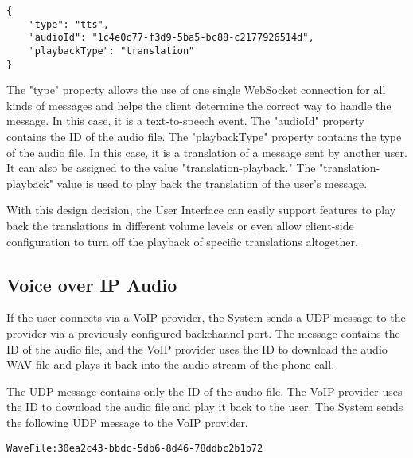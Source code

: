\begin{verbatim}
{
    "type": "tts",
    "audioId": "1c4e0c77-f3d9-5ba5-bc88-c2177926514d",
    "playbackType": "translation"
}
\end{verbatim}

The "type" property allows the use of one single WebSocket connection for all kinds of messages and helps the client 
determine the correct way to handle the message. In this case, it is a text-to-speech event. The "audioId" property 
contains the ID of the audio file. The "playbackType" property contains the type of the audio file. In this case, it is 
a translation of a message sent by another user. It can also be assigned to the value "translation-playback." The 
"translation-playback" value is used to play back the translation of the user's message.

With this design decision, the User Interface can easily support features to play back the translations in different 
volume levels or even allow client-side configuration to turn off the playback of specific translations altogether.

\subsection{Voice over IP Audio}

If the user connects via a VoIP provider, the System sends a UDP message to the provider via a previously configured 
backchannel port. The message contains the ID of the audio file, and the VoIP provider uses the ID to download the 
audio WAV file and plays it back into the audio stream of the phone call. 

The UDP message contains only the ID of the audio file. The VoIP provider uses the ID to download the audio file and 
play it back to the user. The System sends the following UDP message to the VoIP provider. 

\begin{verbatim}
WaveFile:30ea2c43-bbdc-5db6-8d46-78ddbc2b1b72
\end{verbatim}

